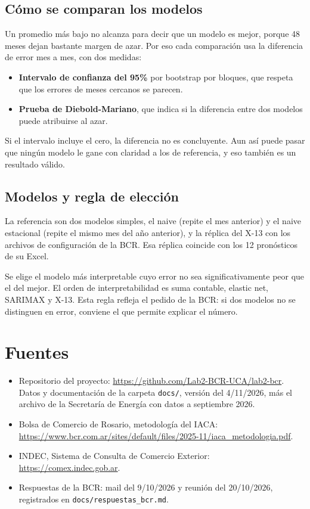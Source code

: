 \documentclass[11pt,a4paper]{article}
\begin{document}
\subsection{Cómo se comparan los modelos}

Un promedio más bajo no alcanza para decir que un modelo es mejor, porque 48 meses dejan bastante margen de azar. Por eso cada comparación usa la diferencia de error mes a mes, con dos medidas:

\begin{itemize}
  \item \textbf{Intervalo de confianza del 95\%} por bootstrap por bloques, que respeta que los errores de meses cercanos se parecen.
  \item \textbf{Prueba de Diebold-Mariano}, que indica si la diferencia entre dos modelos puede atribuirse al azar.
\end{itemize}

Si el intervalo incluye el cero, la diferencia no es concluyente. Aun así puede pasar que ningún modelo le gane con claridad a los de referencia, y eso también es un resultado válido.

\subsection{Modelos y regla de elección}

La referencia son dos modelos simples, el naive (repite el mes anterior) y el naive estacional (repite el mismo mes del año anterior), y la réplica del X-13 con los archivos de configuración de la BCR. Esa réplica coincide con los 12 pronósticos de su Excel.

Se elige el modelo más interpretable cuyo error no sea significativamente peor que el del mejor. El orden de interpretabilidad es suma contable, elastic net, SARIMAX y X-13. Esta regla refleja el pedido de la BCR: si dos modelos no se distinguen en error, conviene el que permite explicar el número.

\section*{Fuentes}

\begin{itemize}
  \item Repositorio del proyecto: \url{https://github.com/Lab2-BCR-UCA/lab2-bcr}. Datos y documentación de la carpeta \texttt{docs/}, versión del 4/11/2026, más el archivo de la Secretaría de Energía con datos a septiembre 2026.
  \item Bolsa de Comercio de Rosario, metodología del IACA: \url{https://www.bcr.com.ar/sites/default/files/2025-11/iaca_metodologia.pdf}.
  \item INDEC, Sistema de Consulta de Comercio Exterior: \url{https://comex.indec.gob.ar}.
  \item Respuestas de la BCR: mail del 9/10/2026 y reunión del 20/10/2026, registrados en \texttt{docs/respuestas\_bcr.md}.
\end{itemize}
\end{document}
